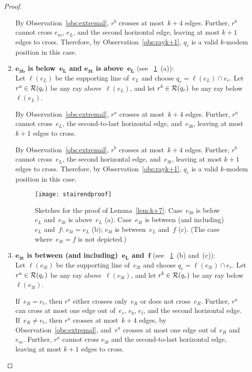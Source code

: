 \documentclass[A4]{article}
\begin{document}
\begin{proof}
\begin{enumerate}
By Observation~\ref{obs:extremal}, $r^b$ crosses at most~$k+4$ edges.
Further, $r^b$ cannot cross $e_m$, $e_L$, and the second horizontal edge, leaving at most $k+1$ edges to cross.
Therefore, by Observation~\ref{obs:rayk+1}, $q_r$ is a valid \mbox{$k$-modem} position in this case.

\item \textbf{$\mathbf{e_{3b}}$ is below~$\mathbf{e_{L}}$ and $\mathbf{e_{3t}}$ is above~$\mathbf{e_{L}}$} (see \figurename~\ref{fig:stairendproof4-5}~(a)):\\
Let $\ell(e_L)$ be the supporting line of~$e_L$ and choose $q_r=\ell(e_L)\cap e_r$.
Let $r^a\in{\cal R}(q_r)$ be any ray above~$\ell(e_L)$, and let $r^b\in{\cal R}(q_r)$ be any ray below~$\ell(e_L)$.

By Observation~\ref{obs:extremal}, $r^a$ crosses at most~$k+4$ edges.
Further, $r^a$ cannot cross~$e_L$, the second-to-last horizontal edge, and~$e_{3b}$, leaving at most $k+1$ edges to cross.

By Observation~\ref{obs:extremal}, $r^b$ crosses at most~$k+4$ edges.
Further, $r^b$ cannot cross~$e_L$, the second horizontal edge, and~$e_{3t}$, leaving at most $k+1$ edges to cross.
Therefore, by Observation~\ref{obs:rayk+1}, $q_r$ is a valid \mbox{$k$-modem} position in this case.

\begin{figure}[htb]
  \centering
  \texttt{[image: stairendproof]}
  \caption{Sketches for the proof of Lemma~\ref{lem:k+7}:
	  Case~${e_{3b}}$ is below~${e_{L}}$ and~${e_{3t}}$ is above~${e_{L}}$ (a).
      Case~${e_{3t}}$ is between (and including)~${e_{L}}$ and~${f}$:
	  ${e_{3t}=e_L}$ (b);
	  ${e_{3t}}$ is between~${e_{L}}$ and~${f}$ (c).
    (The case where~${e_{3t}=f}$ is not depicted.)}
  \label{fig:stairendproof4-5}
\end{figure}

\item \textbf{$\mathbf{e_{3t}}$ is between (and including)~$\mathbf{e_{L}}$ and~$\mathbf{f}$} (see \figurename~\ref{fig:stairendproof4-5}~(b) and~(c)):\\
Let $\ell(e_{3t})$ be the supporting line of~$e_{3t}$ and choose $q_r=\ell(e_{3t})\cap e_r$.
Let $r^a\in{\cal R}(q_r)$ be any ray above~$\ell(e_{3t})$, and let $r^b\in{\cal R}(q_r)$ be any ray below~$\ell(e_{3t})$.

If~$e_R=e_t$, then $r^a$ either crosses only~$e_R$ or does not cross~$e_R$.
Further, $r^a$ can cross at most one edge out of~$e_r$, $e_b$, $e_l$, and the second horizontal edge.
If~$e_R\neq e_t$, then $r^a$ crosses at most~$k+4$ edges, by Observation~\ref{obs:extremal}, and~$r^a$ crosses at most one edge out of~$e_R$ and~$e_m$.
Further, $r^a$ cannot cross $e_{3t}$ and the second-to-last horizontal edge, leaving at most $k+1$ edges to cross.


\end{enumerate}
\end{proof}
\end{document}
